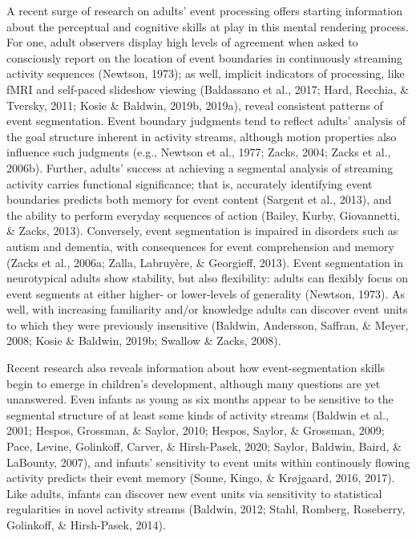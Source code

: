 \documentclass[
  english,
  man,floatsintext]{apa6}
\begin{document}
A recent surge of research on adults' event processing offers starting information about the perceptual and cognitive skills at play in this mental rendering process. For one, adult observers display high levels of agreement when asked to consciously report on the location of event boundaries in continuously streaming activity sequences (Newtson, 1973); as well, implicit indicators of processing, like fMRI and self-paced slideshow viewing (Baldassano et al., 2017; Hard, Recchia, \& Tversky, 2011; Kosie \& Baldwin, 2019b, 2019a), reveal consistent patterns of event segmentation. Event boundary judgments tend to reflect adults' analysis of the goal structure inherent in activity streams, although motion properties also influence such judgments (e.g., Newtson et al., 1977; Zacks, 2004; Zacks et al., 2006b). Further, adults' success at achieving a segmental analysis of streaming activity carries functional significance; that is, accurately identifying event boundaries predicts both memory for event content (Sargent et al., 2013), and the ability to perform everyday sequences of action (Bailey, Kurby, Giovannetti, \& Zacks, 2013). Conversely, event segmentation is impaired in disorders such as autism and dementia, with consequences for event comprehension and memory (Zacks et al., 2006a; Zalla, Labruyère, \& Georgieff, 2013). Event segmentation in neurotypical adults show stability, but also flexibility: adults can flexibly focus on event segments at either higher- or lower-levels of generality (Newtson, 1973). As well, with increasing familiarity and/or knowledge adults can discover event units to which they were previously insensitive (Baldwin, Andersson, Saffran, \& Meyer, 2008; Kosie \& Baldwin, 2019b; Swallow \& Zacks, 2008).

Recent research also reveals information about how event-segmentation skills begin to emerge in children's development, although many questions are yet unanswered. Even infants as young as six months appear to be sensitive to the segmental structure of at least some kinds of activity streams (Baldwin et al., 2001; Hespos, Grossman, \& Saylor, 2010; Hespos, Saylor, \& Grossman, 2009; Pace, Levine, Golinkoff, Carver, \& Hirsh-Pasek, 2020; Saylor, Baldwin, Baird, \& LaBounty, 2007), and infants' sensitivity to event units within continously flowing activity predicts their event memory (Sonne, Kingo, \& Krøjgaard, 2016, 2017). Like adults, infants can discover new event units via sensitivity to statistical regularities in novel activity streams (Baldwin, 2012; Stahl, Romberg, Roseberry, Golinkoff, \& Hirsh-Pasek, 2014).
\end{document}
